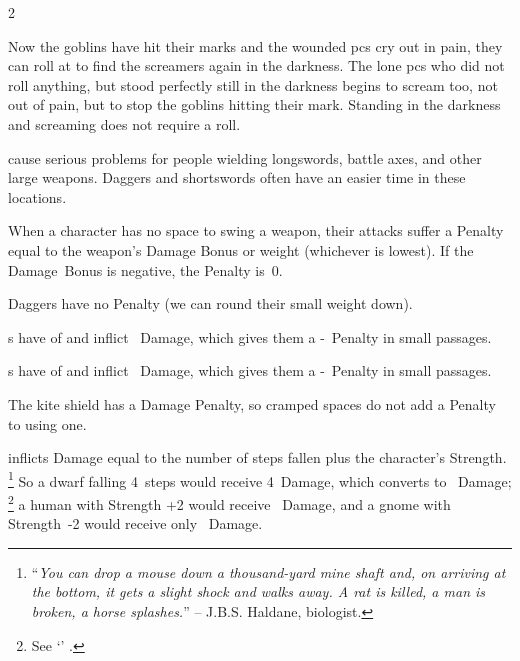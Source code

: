 \begin{multicols}{2}
\begin{exampletext}
  {\sffamily
    Now the goblins have hit their marks and the wounded \glspl{pc} cry out in pain, they can roll  at \tn[5] to find the screamers again in the darkness.
    The lone \glspl{pc} who did not roll anything, but stood perfectly still in the darkness begins to scream too, not out of pain, but to stop the goblins hitting their mark.
    Standing in the darkness and screaming does not require a roll.
  }
\end{exampletext}

cause serious problems for people wielding longswords, battle axes, and other large weapons.
Daggers and shortswords often have an easier time in these locations.

When a character has no space to swing a weapon, their attacks suffer a Penalty equal to the \gls{weapon}'s Damage Bonus or \gls{weight} (whichever is lowest).
If the Damage~Bonus is negative, the Penalty is~0.

\begin{exampletext}
  Daggers have no Penalty (we can round their small \gls{weight} down).
  \maul

  \weaponName s have  of  and inflict ~Damage, which gives them a -~Penalty in small passages.

  \greatsword
  \weaponName s have  of  and inflict ~Damage, which gives them a -~Penalty in small passages.

  The kite shield has a Damage Penalty, so cramped spaces do not add a Penalty to using one.
\end{exampletext}

inflicts Damage equal to the number of \glspl{step} fallen plus the character's Strength.%
\footnote{``\textit{You can drop a mouse down a thousand-yard mine shaft and, on arriving at the bottom, it gets a slight shock and walks away.
A rat is killed, a man is broken, a horse splashes.}'' -- J.B.S. Haldane, biologist.}
So a dwarf falling 4~\glspl{step} would receive 4~Damage, which converts to ~Damage;%
\footnote{See `' .}
a human with Strength +2 would receive ~Damage, and a gnome with Strength~-2 would receive only ~Damage.


\end{multicols}
